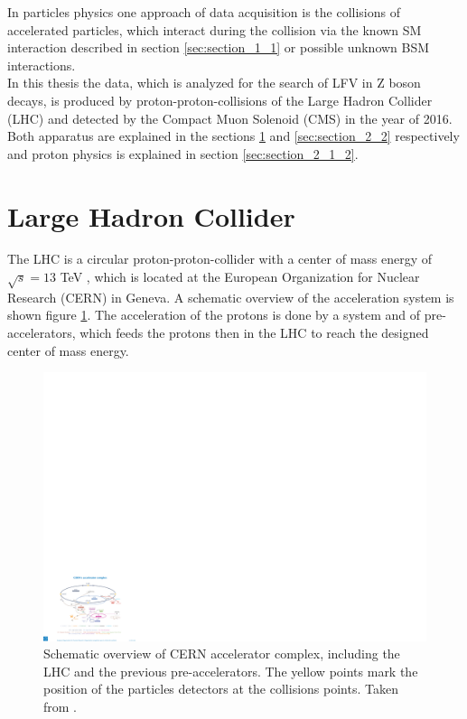 In particles physics one approach of data acquisition is the collisions of accelerated particles, which interact during the collision via the known \gls{SM} interaction described in section \ref{sec:section_1_1} or possible unknown \gls{BSM} interactions. \\

In this thesis the data, which is analyzed for the search of \gls{LFV} in Z boson decays, is produced by proton-proton-collisions of the Large Hadron Collider (\gls{LHC}) \cite{LHC} and detected by the Compact Muon Solenoid (\gls{CMS}) \cite{CMS} in the year of 2016. Both apparatus are explained in the sections \ref{sec:section_2_1} and \ref{sec:section_2_2} respectively and proton physics is explained in section \ref{sec:section_2_1_2}.


\section{Large Hadron Collider}
\label{sec:section_2_1}

The \gls{LHC} is a circular proton-proton-collider with a center of mass energy of $\sqrt{s} = 13$ TeV \cite{LHC2}, which is located at the European Organization for Nuclear Research (\gls{CERN}) in Geneva. A schematic overview of the acceleration system is shown figure \ref{fig:fig_2_1}. The acceleration of the protons is done by a system and of pre-accelerators, which feeds the protons then in the \gls{LHC} to reach the designed center of mass energy. \\

\begin{figure}[ht]
	\centering
	\includegraphics[width=1.0\textwidth]{pictures/LHC.pdf}

	\caption[Schematic overview of CERN accelerator complex]{Schematic overview of \gls{CERN} accelerator complex, including the \gls{LHC} and the previous pre-accelerators. The yellow points mark the position of the particles detectors at the collisions points. Taken from \cite{LHCACCL}.}
	\label{fig:fig_2_1}
\end{figure}

